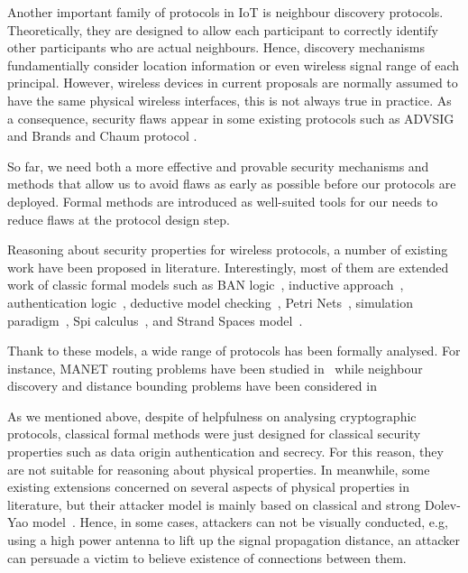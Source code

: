 Another important family of protocols in IoT is neighbour discovery protocols. Theoretically, they are designed to allow each participant to correctly identify other participants who are actual neighbours. Hence, discovery mechanisms fundamentially consider location information or even wireless signal range of each principal. However, wireless devices in current proposals are normally assumed to have the same physical wireless interfaces, this is not always true in practice. As a consequence, security flaws appear in some existing protocols such as ADVSIG~\cite{Raffo:2004:ASS:1029102.1029106} and Brands and Chaum protocol \cite{Brands:1994aa}.

So far, we need both a more effective and provable security mechanisms and methods that allow us to avoid flaws as early as possible before our protocols are deployed. Formal methods are introduced as well-suited tools for our needs to reduce flaws at the protocol design step.

Reasoning about security properties for wireless protocols, a number of existing work have been proposed in literature. Interestingly, most of them are extended work of classic formal models such as BAN logic~\cite{Burrows:1990:LA:77648.77649}, inductive approach~\cite{Paulson:1998:IAV:353677.353681}, authentication logic~\cite{Meadows:2007aa}, deductive model checking~\cite{5678752}, Petri Nets~\cite{Peterson:1977:PN:356698.356702}, simulation paradigm~\cite{Acs:2005aa}, Spi calculus~\cite{Abadi:1997:CCP:266420.266432}, and Strand Spaces model~\cite{674832}.

Thank to these models, a wide range of protocols has been formally analysed. For instance, MANET routing problems have been studied in~\cite{4678548, Jensen:1995:CPN:216127, 1286194, Acs:2005aa, 4428765, Acs:2006:MAS:1180345.1180352, Yang03modelingvulnerabilities, 4481351,Li:2007:ESS:1338438.1338469} while neighbour discovery and distance bounding problems have been considered in ~\cite{RaphaelJamet, SrdjanCapkun2006,Crazzolara:2001:PNC:645609.662336, Basin:2009:LGP:1616077.1616079, Sharp:2007:TTS:2391910.2391948, Meadows:2007aa}

As we mentioned above, despite of helpfulness on analysing cryptographic protocols, classical formal methods were just designed for classical security properties such as data origin authentication and secrecy. For this reason, they are not suitable for reasoning about physical properties. In meanwhile, some existing extensions concerned on several aspects of physical properties in literature, but their attacker model is mainly based on classical and strong Dolev-Yao model~\cite{dolev-yao}. Hence, in some cases, attackers can not be visually conducted, e.g, using a high power antenna to lift up the signal propagation distance, an attacker can persuade a victim to believe existence of connections between them. 

